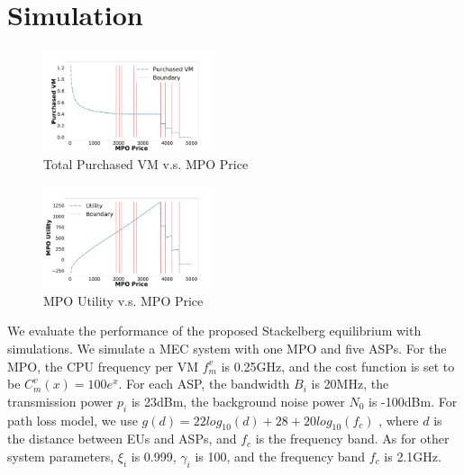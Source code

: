 \documentclass[conference]{IEEEtran}
\begin{document}
\section{Simulation} \label{sec:simulation}

\begin{figure}
    \centering
  \includegraphics[width=0.45\textwidth]{5GDDoS_Game_vm_number_conf.pdf}
  \caption{Total Purchased VM v.s. MPO Price}
\vspace{-0.8em}
  \label{subfig-1:VMnum}
\end{figure}
\begin{figure}
    \centering
  \includegraphics[width=0.45\textwidth]{5GDDoS_Game_utility_conf.pdf}
\caption{MPO Utility v.s. MPO Price}
\vspace{-0.8em}
\label{subfig-2:MPOutil}
\end{figure}

We evaluate the performance of the proposed Stackelberg equilibrium with simulations. We simulate a MEC system with one MPO and five ASPs. For the MPO, the CPU frequency per VM $f_m^v$ is 0.25GHz, and the cost function is set to be $C_m^v(x) = 100e^x$. For each ASP, the bandwidth $B_i$ is 20MHz, the transmission power $p_i$ is 23dBm\cite{3gpp.36.101}, the background noise power $N_0$ is -100dBm\cite{chen2015efficient}. For path loss model, we use $g(d)=22log_{10}(d)+28+20log_{10}(f_c)$ \cite{3gpp.36.814}, where $d$ is the distance between EUs and ASPs, and $f_c$ is the frequency band. As for other system parameters, $\xi_{i}$ is 0.999, $\gamma_i$ is 100, and the frequency band $f_c$ is 2.1GHz.
\end{document}
